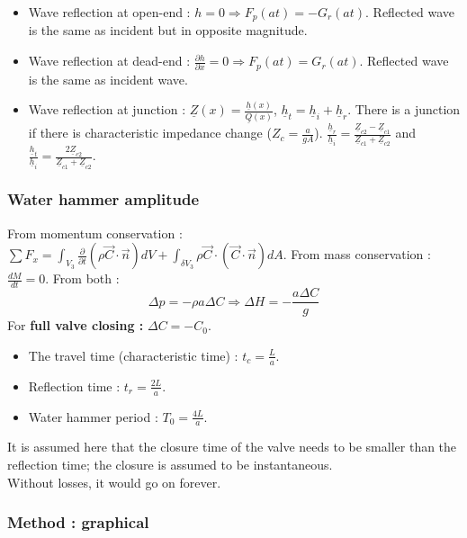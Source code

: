 \documentclass[../main.tex]{subfiles}
\begin{document}
\begin{itemize}
    \item Wave reflection at open-end : $h = 0 \Rightarrow F_p(at) = -G_r(at)$. Reflected wave is the same as incident but in opposite magnitude.
    \item Wave reflection at dead-end : $\frac{\partial h}{\partial x} = 0 \Rightarrow F_p(at) = G_r(at)$. Reflected wave is the same as incident wave.
    \item Wave reflection at junction : $\underline{Z}(x) = \frac{\underline{h}(x)}{\underline{Q}(x)}$, $\underline{h}_t = \underline{h}_i + \underline{h}_r$. There is a junction if there is characteristic impedance change ($Z_c = \frac{a}{gA}$). $\frac{\underline{h}_r}{\underline{h}_i} = \frac{\underline{Z}_{c2}-\underline{Z}_{c1}}{\underline{Z}_{c1} + \underline{Z}_{c2}}$ and $\frac{\underline{h}_t}{\underline{h}_i} = \frac{2 \underline{Z}_{c2}}{\underline{Z}_{c1} + \underline{Z}_{c2}}$.
\end{itemize}

\subsubsection{Water hammer amplitude}
From momentum conservation : $\sum F_x = \int_{V_3} \frac{\partial}{\partial t}(\rho \Vec{C} \cdot \vec{n})dV + \int_{\delta V_3} \rho \vec{C} \cdot(\vec{C} \cdot \vec{n})dA$. From mass conservation : $\frac{dM}{dt}=0$. From both : \begin{equation}
    \Delta p = -\rho a \Delta C \Rightarrow \Delta H = -\frac{a\Delta C}{g}
\end{equation}
For \textbf{full valve closing :} $\Delta C = -C_0$.\\
\begin{itemize}
    \item The travel time (characteristic time) : $t_c = \frac{L}{a}$.
    \item Reflection time : $t_r = \frac{2L}{a}$.
    \item Water hammer period : $T_0 = \frac{4L}{a}$.
\end{itemize}

It is assumed here that the closure time of the valve needs to be smaller than the reflection time; the closure is assumed to be instantaneous. \\
\warning Without losses, it would go on forever. 


\subsubsection{Method : graphical}
\end{document}

